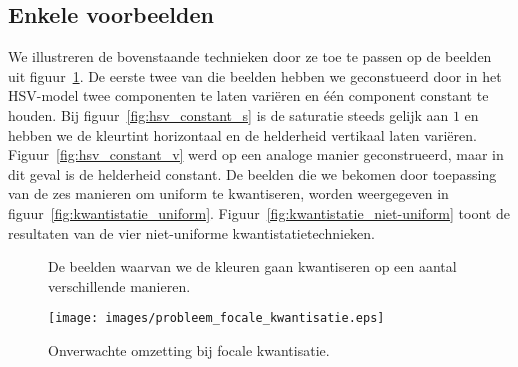 \subsection{Enkele voorbeelden}

We illustreren de bovenstaande technieken door ze toe te passen op de beelden uit 
figuur~\ref{fig:kwantistatie_originelen}. De eerste twee van die beelden hebben we geconstueerd
door in het HSV-model twee componenten te laten vari\"eren en \'e\'en component constant te houden.
Bij figuur~\ref{fig:hsv_constant_s} is de saturatie steeds gelijk aan $1$ en hebben we de kleurtint 
horizontaal en de helderheid vertikaal laten vari\"eren. Figuur~\ref{fig:hsv_constant_v} werd 
op een analoge manier geconstrueerd, maar in dit geval is de helderheid constant.
De beelden die we bekomen door toepassing van de zes manieren om uniform te kwantiseren,
worden weergegeven in figuur~\ref{fig:kwantistatie_uniform}. Figuur~\ref{fig:kwantistatie_niet-uniform}
toont de resultaten van de vier niet-uniforme kwantistatietechnieken.

\begin{figure}[bp]
\vspace{10pt}
\centering
{}
\caption{\label{fig:kwantistatie_originelen}De beelden waarvan we de kleuren gaan kwantiseren 
op een aantal verschillende manieren.}
\end{figure}

\begin{figure}[!bp]
\vspace{5pt}
\centering
\texttt{[image: images/probleem\_focale\_kwantisatie.eps]}
\caption{\label{fig:probleem_focale_kwantisatie}Onverwachte omzetting bij focale kwantisatie.}
\end{figure}

